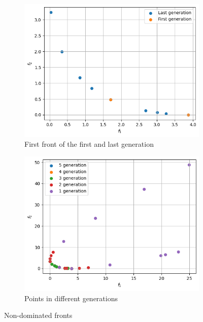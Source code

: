 \begin{figure}[ht]
    \centering
    \hfill
    \begin{subfigure}{0.48\textwidth}
        \includegraphics[width=\textwidth]{images/p3-first_last_frontiers.png}
        \caption{First front of the first and last generation}
        \label{fig:first-last}
    \end{subfigure}
    \hfill
    \begin{subfigure}{0.48\textwidth}
        \includegraphics[width=\textwidth]{images/p3-first_five_generations.png}
        \caption{Points in different generations}
    \end{subfigure}
    \hfill
    \caption{Non-dominated fronts}
\end{figure}

